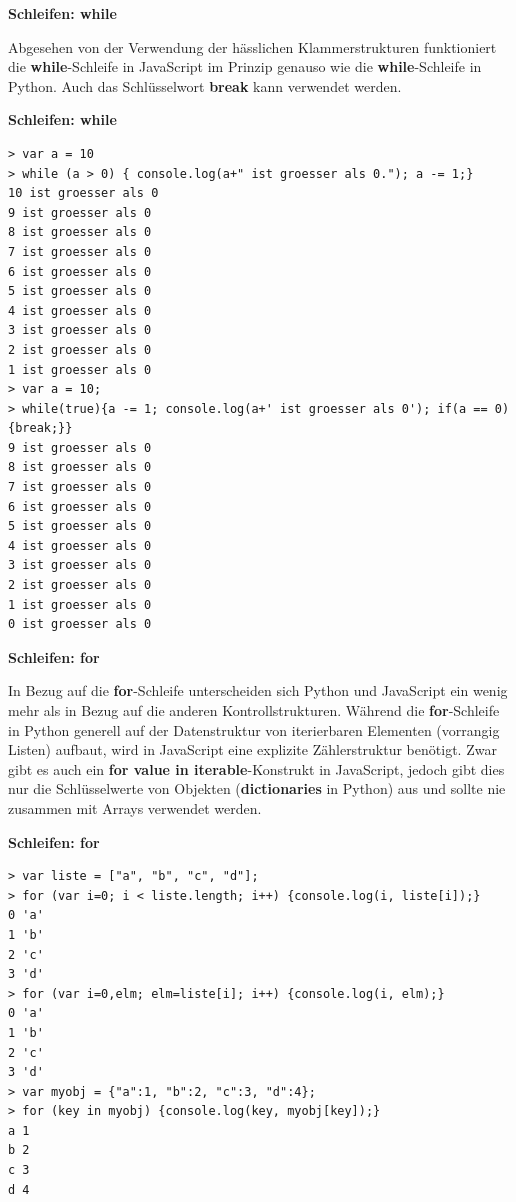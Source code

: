 \par\noindent\textbf{Schleifen: while}

Abgesehen von der Verwendung der hässlichen Klammerstrukturen
funktioniert die \textbf{while}-Schleife in JavaScript im Prinzip
genauso wie die \textbf{while}-Schleife in Python. Auch das
Schlüsselwort \textbf{break} kann verwendet werden.




\par\noindent\textbf{Schleifen: while}

\begin{verbatim}
> var a = 10
> while (a > 0) { console.log(a+" ist groesser als 0."); a -= 1;}
10 ist groesser als 0
9 ist groesser als 0
8 ist groesser als 0
7 ist groesser als 0
6 ist groesser als 0
5 ist groesser als 0
4 ist groesser als 0
3 ist groesser als 0
2 ist groesser als 0
1 ist groesser als 0
> var a = 10;
> while(true){a -= 1; console.log(a+' ist groesser als 0'); if(a == 0){break;}}
9 ist groesser als 0 
8 ist groesser als 0 
7 ist groesser als 0 
6 ist groesser als 0 
5 ist groesser als 0 
4 ist groesser als 0 
3 ist groesser als 0 
2 ist groesser als 0 
1 ist groesser als 0 
0 ist groesser als 0 
\end{verbatim}




\par\noindent\textbf{Schleifen: for}

In Bezug auf die \textbf{for}-Schleife unterscheiden sich Python und
JavaScript ein wenig mehr als in Bezug auf die anderen
Kontrollstrukturen. Während die \textbf{for}-Schleife in Python generell
auf der Datenstruktur von iterierbaren Elementen (vorrangig Listen)
aufbaut, wird in JavaScript eine explizite Zählerstruktur benötigt. Zwar
gibt es auch ein \textbf{for value in iterable}-Konstrukt in JavaScript,
jedoch gibt dies nur die Schlüsselwerte von Objekten
(\textbf{dictionaries} in Python) aus und sollte nie zusammen mit Arrays
verwendet werden.




\par\noindent\textbf{Schleifen: for}

\begin{verbatim}
> var liste = ["a", "b", "c", "d"];
> for (var i=0; i < liste.length; i++) {console.log(i, liste[i]);}
0 'a'
1 'b'
2 'c'
3 'd'
> for (var i=0,elm; elm=liste[i]; i++) {console.log(i, elm);}
0 'a'
1 'b'
2 'c'
3 'd'
> var myobj = {"a":1, "b":2, "c":3, "d":4};
> for (key in myobj) {console.log(key, myobj[key]);}
a 1
b 2
c 3
d 4
\end{verbatim}

